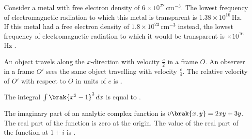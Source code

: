    \item 
    Consider a metal with free electron density of $6 \times 10^{22} \, \text{cm}^{-3}$. The lowest frequency of electromagnetic radiation to which this metal is transparent is $1.38 \times 10^{16} \, \text{Hz}$. If this metal had a free electron density of $1.8 \times 10^{23} \, \text{cm}^{-3}$ instead, the lowest frequency of electromagnetic radiation to which it would be transparent is $\times 10^{16}$ Hz .
    
    \item
    An object travels along the $x$-direction with velocity $\frac{c}{2}$ in a frame $O$. An observer in a frame $O\prime$ sees the same object travelling with velocity $\frac{c}{4}$. The relative velocity of $O\prime$ with respect to $O$ in units of $c$ is  .
    
    \item 
    The integral $\int \brak{x^2 - 1}^3 \, dx$ is equal to .

    \item 
    The imaginary part of an analytic complex function is $v\brak{x, y} = 2xy + 3y$. The real part of the function is zero at the origin. The value of the real part of the function at $1 + i$ is  .






 


